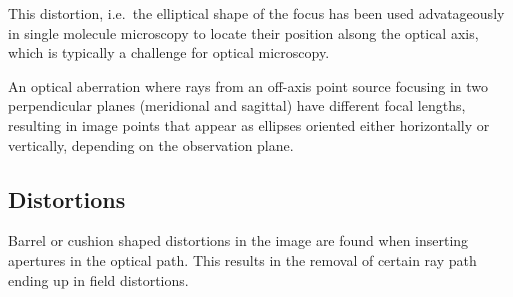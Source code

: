 \documentclass[
  a4paper,
]{book}
\begin{document}
This distortion, i.e.~the elliptical shape of the focus has been used
advatageously in single molecule microscopy to locate their position
alsong the optical axis, which is typically a challenge for optical
microscopy.

\begin{tcolorbox}[enhanced jigsaw, coltitle=black, title=\textcolor{quarto-callout-note-color}{\faInfo}\hspace{0.5em}{Astigmatism}, colframe=quarto-callout-note-color-frame, toprule=.15mm, opacitybacktitle=0.6, left=2mm, opacityback=0, breakable, toptitle=1mm, bottomtitle=1mm, leftrule=.75mm, arc=.35mm, titlerule=0mm, colbacktitle=quarto-callout-note-color!10!white, rightrule=.15mm, bottomrule=.15mm, colback=white]

An optical aberration where rays from an off-axis point source focusing
in two perpendicular planes (meridional and sagittal) have different
focal lengths, resulting in image points that appear as ellipses
oriented either horizontally or vertically, depending on the observation
plane.

\end{tcolorbox}

\subsection{Distortions}\label{distortions}

Barrel or cushion shaped distortions in the image are found when
inserting apertures in the optical path. This results in the removal of
certain ray path ending up in field distortions.
\end{document}
